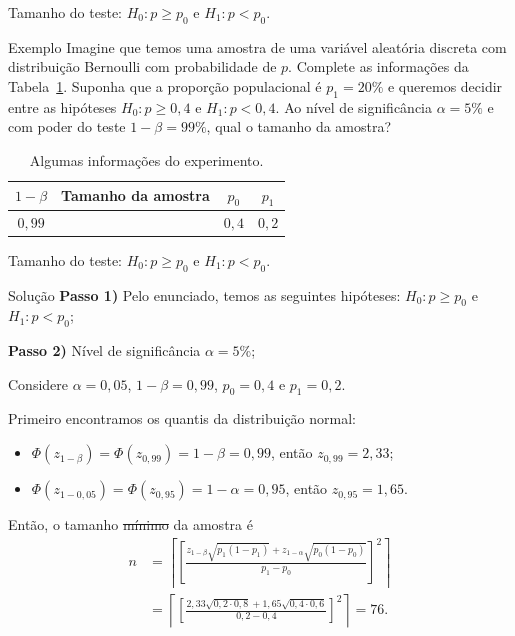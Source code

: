 \documentclass[8pt]{beamer}
\begin{document}
\begin{frame}{Tamanho do teste: $H_0: p \geq p_0$ e $H_1: p < p_0$.}


\begin{block}{Exemplo}
	Imagine que temos uma amostra de uma variável aleatória discreta com distribuição Bernoulli com probabilidade de $p$. Complete as informações da Tabela~\ref{tab:proportion-unilateral-h0-upper-sample-size}. Suponha que a proporção populacional é $p_1=20\%$ e queremos decidir entre as hipóteses $H_0: p \geq 0,4$ e $H_1:p < 0,4$. Ao nível de significância $\alpha=5\%$ e com poder do teste $1-\beta=99\%$, qual o tamanho da amostra?
	\begin{table}[ht]
		\centering
		\begin{tabular}{c|c|c|c}
			\toprule[0.05cm]
			$1-\beta$ & Tamanho da amostra & $p_0$ & $p_1$  \\ 
			\midrule
			$0,99$ &  & $0,4$ & $0,2$  \\ 
			\bottomrule[0.05cm]
		\end{tabular}
		\caption{Algumas informações do experimento.} 
		\label{tab:proportion-unilateral-h0-upper-sample-size}
	\end{table}
\end{block}

%	
%	
%
\end{frame}

\begin{frame}{Tamanho do teste: $H_0: p \geq p_0$ e $H_1: p < p_0$.}

\begin{block}{Solução}
	\textbf{Passo 1)}  Pelo enunciado, temos as seguintes hipóteses: $H_0: p \geq p_0$ e $H_1: p < p_0$;

	\textbf{Passo 2)} Nível de significância $\alpha=5\%$;

	Considere $\alpha=0,05$, $1-\beta=0,99$, $p_0 = 0,4$ e $p_1=0,2$. 
	
	Primeiro encontramos os quantis da distribuição normal:
	\begin{itemize}
		\item $\Phi\left( z_{1-\beta} \right) = \Phi\left( z_{0,99} \right) = 1-\beta = 0,99$, então $z_{0,99} = 2,33$;
		\item $\Phi\left( z_{1-0,05} \right) = \Phi\left( z_{0,95} \right) = 1-\alpha = 0,95$, então $z_{0,95} = 1,65$.
	\end{itemize}
	Então, o tamanho \sout{mínimo} da amostra é 
	\begin{align*}
		n &= \left\lceil \left[ \frac{ z_{1-\beta}\sqrt{p_1(1 - p_1)} + z_{1-\alpha}\sqrt{p_0(1 - p_0)}}{p_1-p_0} \right]^2 \right\rceil\\
		&= \left\lceil \left[ \frac{ 2,33 \sqrt{0,2 \cdot 0,8} + 1,65 \sqrt{0,4 \cdot 0,6} }{0,2 - 0,4}  \right]^2 \right\rceil = 76.
	\end{align*}

\end{block}
\end{frame}
\end{document}
